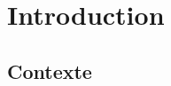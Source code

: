 \chapter{Introduction}
\label{Introduction}
\thispagestyle{fancy}

\section{Contexte}
\label{Introduction:Contexte}